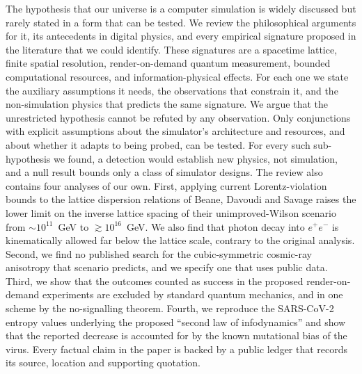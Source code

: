 The hypothesis that our universe is a computer simulation is widely discussed but rarely stated in a form that can be tested. We review the philosophical arguments for it, its antecedents in digital physics, and every empirical signature proposed in the literature that we could identify. These signatures are a spacetime lattice, finite spatial resolution, render-on-demand quantum measurement, bounded computational resources, and information-physical effects. For each one we state the auxiliary assumptions it needs, the observations that constrain it, and the non-simulation physics that predicts the same signature. We argue that the unrestricted hypothesis cannot be refuted by any observation. Only conjunctions with explicit assumptions about the simulator's architecture and resources, and about whether it adapts to being probed, can be tested. For every such sub-hypothesis we found, a detection would establish new physics, not simulation, and a null result bounds only a class of simulator designs. The review also contains four analyses of our own. First, applying current Lorentz-violation bounds to the lattice dispersion relations of Beane, Davoudi and Savage raises the lower limit on the inverse lattice spacing of their unimproved-Wilson scenario from $\sim10^{11}$~GeV to $\gtrsim10^{16}$~GeV. We also find that photon decay into $e^+e^-$ is kinematically allowed far below the lattice scale, contrary to the original analysis. Second, we find no published search for the cubic-symmetric cosmic-ray anisotropy that scenario predicts, and we specify one that uses public data. Third, we show that the outcomes counted as success in the proposed render-on-demand experiments are excluded by standard quantum mechanics, and in one scheme by the no-signalling theorem. Fourth, we reproduce the SARS-CoV-2 entropy values underlying the proposed ``second law of infodynamics'' and show that the reported decrease is accounted for by the known mutational bias of the virus. Every factual claim in the paper is backed by a public ledger that records its source, location and supporting quotation.
